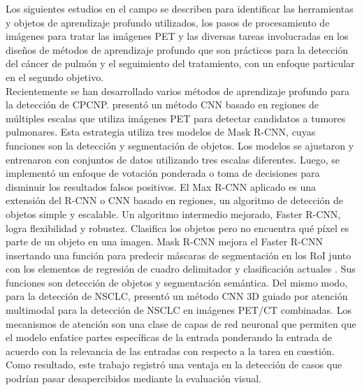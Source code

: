 \documentclass[11pt,a4paper,openany]{article}
\begin{document}
        Los siguientes estudios en el campo se describen para identificar las herramientas y objetos de aprendizaje profundo utilizados, los pasos de procesamiento de imágenes para tratar las imágenes PET y las diversas tareas involucradas en los diseños de métodos de aprendizaje profundo que son prácticos para la detección del cáncer de pulmón y el seguimiento del tratamiento, con un enfoque particular en el segundo objetivo. \\

        Recientemente se han desarrollado varios métodos de aprendizaje profundo para la detección de CPCNP. \cite{Zhang2019} presentó un método CNN basado en regiones de múltiples escalas que utiliza imágenes PET para detectar candidatos a tumores pulmonares. Esta estrategia utiliza tres modelos de Mask R-CNN, cuyas funciones son la detección y segmentación de objetos. Los modelos se ajustaron y entrenaron con conjuntos de datos utilizando tres escalas diferentes. Luego, se implementó un enfoque de votación ponderada o toma de decisiones para disminuir los resultados falsos positivos. El Max R-CNN aplicado es una extensión del R-CNN o CNN basado en regiones, un algoritmo de detección de objetos simple y escalable. Un algoritmo intermedio mejorado, Faster R-CNN, logra flexibilidad y robustez. Clasifica los objetos pero no encuentra qué píxel es parte de un objeto en una imagen. Mask R-CNN mejora el Faster R-CNN insertando una función para predecir máscaras de segmentación en los RoI junto con los elementos de regresión de cuadro delimitador y clasificación actuales \cite{He2017}. Sus funciones son detección de objetos y segmentación semántica. Del mismo modo, para la detección de NSCLC, \cite{Chen2022} presentó un método CNN 3D guiado por atención multimodal para la detección de NSCLC en imágenes PET/CT combinadas. Los mecanismos de atención son una clase de capas de red neuronal que permiten que el modelo enfatice partes específicas de la entrada ponderando la entrada de acuerdo con la relevancia de las entradas con respecto a la tarea en cuestión. Como resultado, este trabajo registró una ventaja en la detección de casos que podrían pasar desapercibidos mediante la evaluación visual. \\
\end{document}
